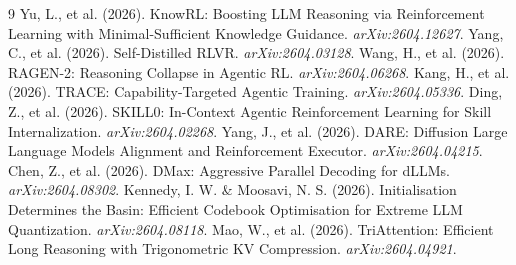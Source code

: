 \documentclass[11pt]{article}
\begin{document}
\begin{thebibliography}{9}
 Yu, L., et al. (2026). KnowRL: Boosting LLM Reasoning via Reinforcement Learning with Minimal-Sufficient Knowledge Guidance. \textit{arXiv:2604.12627}.
 Yang, C., et al. (2026). Self-Distilled RLVR. \textit{arXiv:2604.03128}.
 Wang, H., et al. (2026). RAGEN-2: Reasoning Collapse in Agentic RL. \textit{arXiv:2604.06268}.
 Kang, H., et al. (2026). TRACE: Capability-Targeted Agentic Training. \textit{arXiv:2604.05336}.
 Ding, Z., et al. (2026). SKILL0: In-Context Agentic Reinforcement Learning for Skill Internalization. \textit{arXiv:2604.02268}.
 Yang, J., et al. (2026). DARE: Diffusion Large Language Models Alignment and Reinforcement Executor. \textit{arXiv:2604.04215}.
 Chen, Z., et al. (2026). DMax: Aggressive Parallel Decoding for dLLMs. \textit{arXiv:2604.08302}.
 Kennedy, I. W. \& Moosavi, N. S. (2026). Initialisation Determines the Basin: Efficient Codebook Optimisation for Extreme LLM Quantization. \textit{arXiv:2604.08118}.
 Mao, W., et al. (2026). TriAttention: Efficient Long Reasoning with Trigonometric KV Compression. \textit{arXiv:2604.04921}.
\end{thebibliography}
\end{document}
